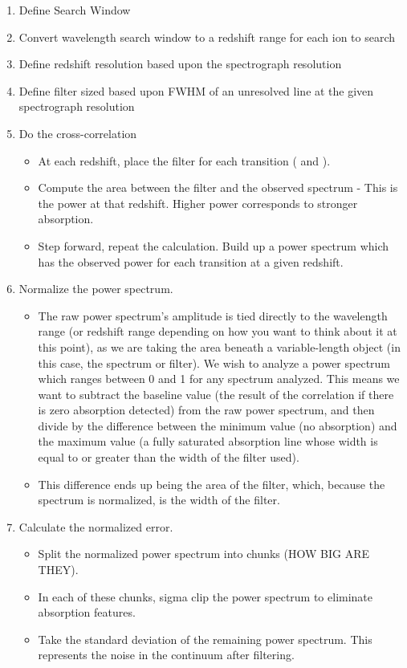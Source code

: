 \begin{enumerate}
\item Define Search Window
\item Convert wavelength search window to a redshift range for each ion to search
\item Define redshift resolution based upon the spectrograph resolution
\item Define filter sized based upon FWHM of an unresolved line at the given spectrograph resolution
\item Do the cross-correlation
\begin{itemize}
\item At each redshift, place the filter for each transition ({\MgIIdblt} and {\CIVdblt}).
\item Compute the area between the filter and the observed spectrum - This is the power at that redshift. Higher power corresponds to stronger absorption.
\item Step forward, repeat the calculation. Build up a power spectrum which has the observed power for each transition at a given redshift.
\end{itemize}
\item Normalize the power spectrum.
\begin{itemize}
\item The raw power spectrum's amplitude is tied directly to the wavelength range (or redshift range depending on how you want to think about it at this point), as we are taking the area beneath a variable-length object (in this case, the spectrum or filter). We wish to analyze a power spectrum which ranges between 0 and 1 for any spectrum analyzed. This means we want to subtract the baseline value (the result of the correlation if there is zero absorption detected) from the raw power spectrum, and then divide by the difference between the minimum value (no absorption) and the maximum value (a fully saturated absorption line whose width is equal to or greater than the width of the filter used).
\item This difference ends up being the area of the filter, which, because the spectrum is normalized, is the width of the filter.
\end{itemize}
\item Calculate the normalized error.
\begin{itemize}
\item Split the normalized power spectrum into chunks (HOW BIG ARE THEY).
\item In each of these chunks, sigma clip the power spectrum to eliminate absorption features.
\item Take the standard deviation of the remaining power spectrum. This represents the noise in the continuum after filtering.

\end{itemize}
\end{enumerate}
